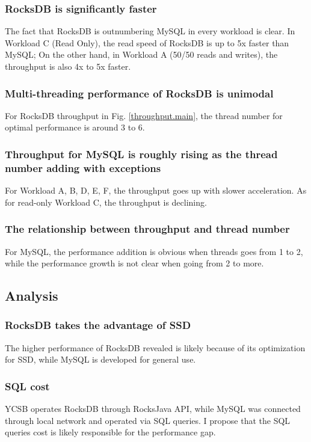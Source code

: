 \documentclass[journal]{IEEEtran}
\begin{document}
\subsubsection{RocksDB is significantly faster}

The fact that RocksDB is outnumbering MySQL in every workload is clear. In Workload C (Read Only), the read speed of RocksDB is up to 5x faster than MySQL; On the other hand, in Workload A (50/50 reads and writes), the throughput is also 4x to 5x faster.

\subsubsection{Multi-threading performance of RocksDB is unimodal}

For RocksDB throughput in Fig. \ref{throughput.main}, the thread number for optimal performance is around 3 to 6.

\subsubsection{Throughput for MySQL is roughly rising as the thread number adding with exceptions} For Workload A, B, D, E, F, the throughput goes up with slower acceleration. As for read-only Workload C, the throughput is declining.

\subsubsection{The relationship between throughput and thread number} For MySQL, the performance addition is obvious when threads goes from 1 to 2, while the performance growth is not clear when going from 2 to more.

\subsection{Analysis}

\subsubsection{RocksDB takes the advantage of SSD} The higher performance of RocksDB revealed is likely because of its optimization for SSD, while MySQL is developed for general use.

\subsubsection{SQL cost} YCSB operates RocksDB through RocksJava API, while MySQL was connected through local network and operated via SQL queries. I propose that the SQL queries cost is likely responsible for the performance gap.
\end{document}
